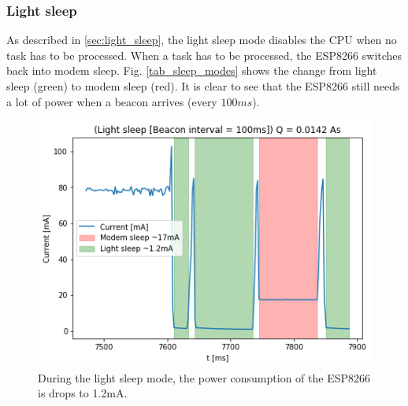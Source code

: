 \subsubsection{Light sleep}
As described in \ref{sec:light_sleep}, the light sleep mode disables the CPU when no task has to be processed.
When a task has to be processed, the ESP8266 switches back into modem sleep.
Fig. \ref{tab_sleep_modes} shows the change from light sleep (green) to modem sleep (red).
It is clear to see that the ESP8266 still needs a lot of power when a beacon arrives (every $100ms$).

\begin{figure}[h]
    \includegraphics[width = \linewidth]{fig/light_sleep.png}
    \caption{During the light sleep mode, the power consumption of the ESP8266 is drops to 1.2mA.}
    \label{fig:light_sleep}
\end{figure}

